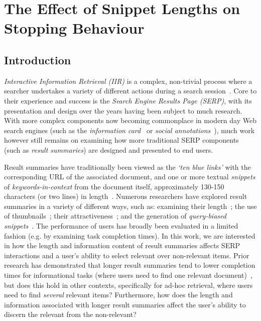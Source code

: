 
\chapter[The Effects of Snippet Lengths on Stopping Behaviour]{The Effect of Snippet Lengths on\\Stopping Behaviour}\label{chap:snippets}
\section{Introduction}

\emph{Interactive Information Retrieval (IIR)} is a complex, non-trivial process where a searcher undertakes a variety of different actions during a search session~\cite{ingwersen2005theturn}. Core to their experience and success is the \emph{Search Engine Results Page (SERP)}, with its presentation and design over the years having been subject to much research. With more complex components now becoming commonplace in modern day Web search engines (such as the \emph{information card}~\cite{bota2016playing_your_cards, navalpakkam2013entity_cards} or \emph{social annotations}~\cite{muralidharan2012social_annotations}), much work however still remains on examining how more traditional SERP components (such as \emph{result summaries}) are designed and presented to end users.

Result summaries have traditionally been viewed as the \emph{`ten blue links'} with the corresponding URL of the associated document, and one or more textual \emph{snippets} of \emph{keywords-in-context} from the document itself, approximately 130-150 characters (or two lines) in length~\cite{hearst2009_search}. Numerous researchers have explored result summaries in a variety of different ways, such as: examining their length~\cite{paek2004wavelens,cutrell2007result_page,kaisser2008improving}; the use of thumbnails~\cite{teevan2009visual_snippets,woodruff2002summaries}; their attractiveness~\cite{clarke2007caption_features,he2012bridging}; and the generation of \emph{query-biased snippets}~\cite{tombros1998query_biased,rose2007snippet_attributes}. The performance of users has broadly been evaluated in a limited fashion (e.g. by examining task completion times). In this work, we are interested in how the length and information content of result summaries affects SERP interactions and a user's ability to select relevant over non-relevant items. Prior research has demonstrated that longer result summaries tend to lower completion times for informational tasks (where users need to find one relevant document)~\cite{cutrell2007result_page}, but does this hold in other contexts, specifically for ad-hoc retrieval, where users need to find \emph{several} relevant items? Furthermore, how does the length and information associated with longer result summaries affect the user's ability to discern the relevant from the non-relevant?

